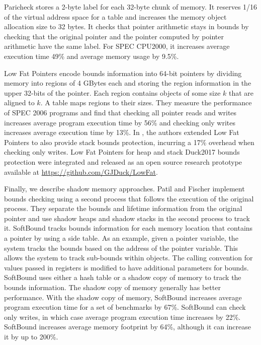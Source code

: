 Paricheck \cite{Younan2010} stores a 2-byte label for each 32-byte chunk of memory.
It reserves 1/16 of the virtual address space for a table and increases
the memory object allocation size to 32 bytes.
It checks that pointer arithmetic stays in bounds by checking that the
original pointer and the pointer computed by pointer arithmetic have the
same label. For SPEC CPU2000, it increases average execution time 49\% and
average  memory usage by 9.5\%.

Low Fat Pointers \cite{Duck2016} encode bounds information into 64-bit pointers by
dividing memory into  regions of 4 GBytes each and storing
the region information in the upper 32-bits of the pointer.  Each
region contains objects of some size $k$ that are aligned to $k$.
A table maps regions to their sizes.  They measure the performance of 
SPEC 2006 programs and find that checking all pointer reads and writes
increases average program execution time by 56\% and checking only writes 
increases average execution time by 13\%. In \cite{Duck2017}, the authors extended 
Low Fat Pointers to also provide stack bounds protection, incurring a 17\% overhead when checking 
only writes. Low Fat Pointers for heap \cite{Duck2016} and stack {Duck2017} bounds protection were
integrated and released as an open source research prototype available at 
\url{https://github.com/GJDuck/LowFat}.

Finally, we describe shadow memory approaches.
Patil and Fischer \cite{Patil1997}
implement bounds checking using a second process that follows the execution 
of the original process.  They separate the bounds and lifetime information
from the original pointer and use shadow heaps and shadow stacks in the
second process to track it.  
SoftBound \cite{Nagarakatte2009} tracks bounds information
for each  memory location that contains a pointer by using a side table.  
As an example, given a pointer variable,
the system tracks the bounds based on the address of the pointer variable.
This allows the system to track sub-bounds within objects.  The calling
convention for values passed in registers is modified to have additional
parameters for bounds.  SoftBound uses either a hash table or
a shadow copy of memory to track the bounds information.   The shadow
copy of memory generally has better performance.  With the shadow
copy of memory, SoftBound increases average program execution time for
a set of benchmarks by 67\%.   SoftBound can check only writes, in which
case average program execution time increases by 22\%.   SoftBound increases 
average memory footprint by 64\%, although it can increase it by up to 200\%.

